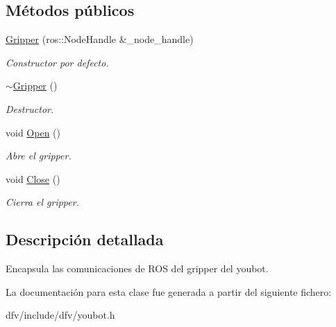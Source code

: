 \subsection*{\-Métodos públicos}
\begin{DoxyCompactItemize}
\item 
\hypertarget{classdfv_1_1Gripper_a332cae0d0403c28abbc6ebbbe23d9c09}{\hyperlink{classdfv_1_1Gripper_a332cae0d0403c28abbc6ebbbe23d9c09}{\-Gripper} (ros\-::\-Node\-Handle \&\-\_\-node\-\_\-handle)}\label{classdfv_1_1Gripper_a332cae0d0403c28abbc6ebbbe23d9c09}

\begin{DoxyCompactList}\small\item\em \-Constructor por defecto. \end{DoxyCompactList}\item 
\hypertarget{classdfv_1_1Gripper_abcf75bea744f6b3f025cde7f332bd990}{\hyperlink{classdfv_1_1Gripper_abcf75bea744f6b3f025cde7f332bd990}{$\sim$\-Gripper} ()}\label{classdfv_1_1Gripper_abcf75bea744f6b3f025cde7f332bd990}

\begin{DoxyCompactList}\small\item\em \-Destructor. \end{DoxyCompactList}\item 
\hypertarget{classdfv_1_1Gripper_a113420d6e814f142851ba071b70c067d}{void \hyperlink{classdfv_1_1Gripper_a113420d6e814f142851ba071b70c067d}{\-Open} ()}\label{classdfv_1_1Gripper_a113420d6e814f142851ba071b70c067d}

\begin{DoxyCompactList}\small\item\em \-Abre el gripper. \end{DoxyCompactList}\item 
\hypertarget{classdfv_1_1Gripper_a0c552cd2c919e72997aa559ccc511242}{void \hyperlink{classdfv_1_1Gripper_a0c552cd2c919e72997aa559ccc511242}{\-Close} ()}\label{classdfv_1_1Gripper_a0c552cd2c919e72997aa559ccc511242}

\begin{DoxyCompactList}\small\item\em \-Cierra el gripper. \end{DoxyCompactList}\end{DoxyCompactItemize}


\subsection{\-Descripción detallada}
\-Encapsula las comunicaciones de \-R\-O\-S del gripper del youbot. 

\-La documentación para esta clase fue generada a partir del siguiente fichero\-:\begin{DoxyCompactItemize}
\item 
dfv/include/dfv/youbot.\-h\end{DoxyCompactItemize}
